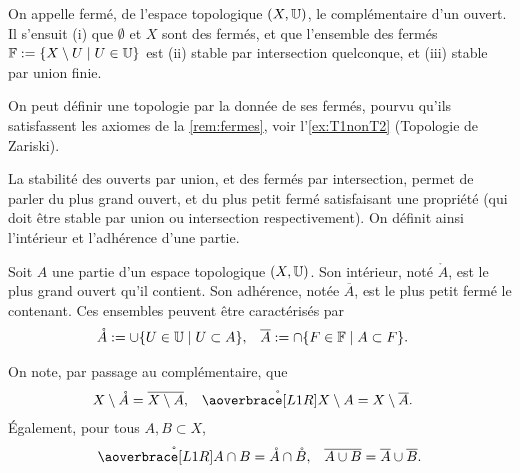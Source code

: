 \begin{remark}[Fermés]
\label{rem:fermes}
%
On appelle fermé, de l'espace topologique $(X,\mathbb{U})$, le complémentaire d'un ouvert. Il s'ensuit (i) que $\emptyset$ et $X$ sont des fermés, et que l'ensemble des fermés $\mathbb{F} := \{X \setminus U\mid U \in \mathbb{U}\}$ est (ii) stable par intersection quelconque, et (iii) stable par union finie. 
\end{remark}

On peut définir une topologie par la donnée de ses fermés, pourvu qu'ils satisfassent les axiomes de la \cref{rem:fermes}, voir l'\cref{ex:T1nonT2} (Topologie de Zariski).

La stabilité des ouverts par union, et des fermés par intersection, permet de parler du plus grand ouvert, et du plus petit fermé satisfaisant une propriété (qui doit être stable par union ou intersection respectivement). On définit ainsi l'intérieur et l'adhérence d'une partie.

\begin{definition}
\label{def:interieur}
%
Soit $A$ une partie d'un espace topologique $(X,\mathbb{U})$. Son intérieur, noté $\mathring A$, est le plus grand ouvert qu'il contient. Son adhérence, notée $\overline A$, est le plus petit fermé le contenant. Ces ensembles peuvent être caractérisés par 
\begin{align}
\label{eqdef:int_adh}
	\mathring A &:= \cup \{U\in \mathbb{U} \mid U \subset A\}, &
	\overline A &:= \cap \{F \in \mathbb{F} \mid A \subset F\}.
\end{align}	
\end{definition}

On note, par passage au complémentaire, que
\begin{align}
\label{eq:int_adh_compl}
	X \sm \mathring A &= \overline {X \sm A}, &
	\mathring {\overpar{X \sm A}} &= X \sm \overline A. 
\leancheck{eq:int_adh_compl}%
\end{align}
Également, pour tous $A,B \subset X$,
\begin{align}
\label{eq:int_inter_adh_cup}
	\mathring{\overpar{A \cap B}} &= \mathring A \cap \mathring B,&
	\overline {A \cup B} = \overline A \cup \overline B.
\leancheck{eq:int_inter_adh_cup}%
\end{align}


